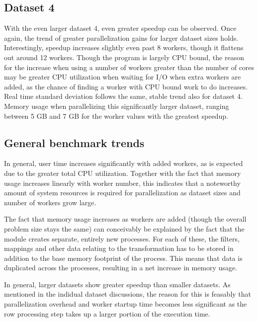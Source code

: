 \subsection{Dataset 4}
With the even larger dataset 4, even greater speedup can be observed. Once again, the trend of greater parallelization gains for larger
dataset sizes holds. Interestingly, speedup increases slightly even past 8 workers, though it flattens out around 12 workers.
Though the program is largely CPU bound, the reason for the increase when using a number of workers greater than the number of cores may be
greater CPU utilization when waiting for I/O when extra workers are added, as the chance of finding a worker with CPU bound work to do increases. 
Real time standard deviation follows the same, stable trend also for dataset 4.  Memory usage when parallelizing this significantly larger dataset,
ranging between 5 GB and 7 GB for the worker values with the greatest speedup.

\subsection{General benchmark trends}
In general, user time increases significantly with added workers, as is expected due to the greater total CPU utilization. Together with the
fact that memory usage increases linearly with worker number, this indicates that a noteworthy amount of system resources is required 
for parallelization as dataset sizes and number of workers grow large.

The fact that memory usage increases as workers are added (though the overall problem size stays the same)
can conceivably be explained by the fact that the  module creates separate, entirely
new processes. For each of these, the filters, mappings and other data relating to the transformation has to be stored in addition to the
base memory footprint of the process. This means that data is duplicated across the processes, resulting in a net increase in memory usage.

In general, larger datasets show greater speedup than smaller datasets. As mentioned in the indidual dataset discussions, the reason for this
is feasably that parallelization overhead and worker startup time becomes less significant as the row processing step takes up a larger portion
of the execution time.
